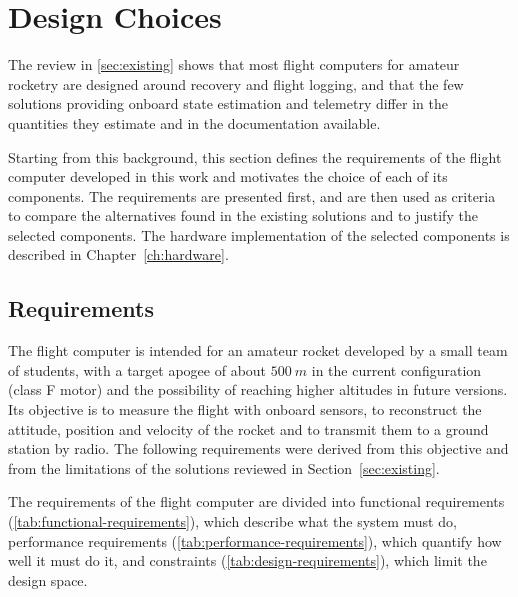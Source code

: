 
\newcommand{\reqdef}[1]{\hypertarget{req:#1}{#1}}
\newcommand{\req}[1]{\hyperlink{req:#1}{#1}}

\section{Design Choices}
\label{sec:choices}

The review in \cref{sec:existing} shows that most flight computers for amateur rocketry are designed around recovery and flight logging, and that the few solutions providing onboard state estimation and telemetry differ in the quantities they estimate and in the documentation available.

Starting from this background, this section defines the requirements of the flight computer developed in this work and motivates the choice of each of its components. The requirements are presented first, and are then used as criteria to compare the alternatives found in the existing solutions and to justify the selected components. The hardware implementation of the selected components is described in Chapter~\ref{ch:hardware}.

\subsection{Requirements}
\label{sec:requirements}

The flight computer is intended for an amateur rocket developed by a small team of students, with a target apogee of about $\SI{500}{m}$ in the current configuration (class F motor) and the possibility of reaching higher altitudes in future versions. Its objective is to measure the flight with onboard sensors, to reconstruct the attitude, position and velocity of the rocket and to transmit them to a ground station by radio. The following requirements were derived from this objective and from the limitations of the solutions reviewed in Section~\ref{sec:existing}.

The requirements of the flight computer are divided into functional requirements (\cref{tab:functional-requirements}), which describe what the system must do, performance requirements (\cref{tab:performance-requirements}), which quantify how well it must do it, and constraints (\cref{tab:design-requirements}), which limit the design space. 

